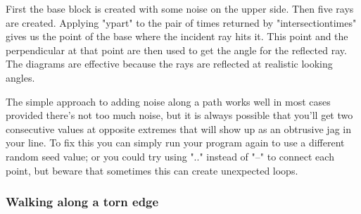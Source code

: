 \documentclass[a4paper,landscape]{article}
\begin{document}
First the base block is created with some noise on the upper side.  Then five rays
are created.  Applying "ypart" to the pair of times returned by "intersectiontimes"
gives us the point of the base where the incident ray hits it.  This point and the
perpendicular at that point are then used to get the angle for the reflected ray.
The diagrams are effective because the rays are reflected at realistic looking
angles.

The simple approach to adding noise along a path works well in most cases provided
there's not too much noise,  but it is always possible that you'll get two consecutive
values at opposite extremes that will show up as an obtrusive jag in your line.  To
fix this you can simply run your program again to use a different random seed value;
or you could try using ".." instead of "--" to connect each point, but beware that
sometimes this can create unexpected loops.  

\newpage\subsubsection{Walking along a torn edge}
\end{document}
